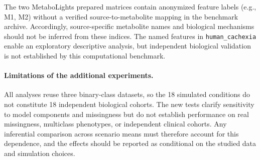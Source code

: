 The two MetaboLights prepared matrices contain anonymized feature labels (e.g., M1, M2) without a verified source-to-metabolite mapping in the benchmark archive. Accordingly, source-specific metabolite names and biological mechanisms should not be inferred from these indices. The named features in \texttt{human\_cachexia} enable an exploratory descriptive analysis, but independent biological validation is not established by this computational benchmark.

\paragraph{Limitations of the additional experiments.}
All analyses reuse three binary-class datasets, so the 18 simulated conditions do not constitute 18 independent biological cohorts. The new tests clarify sensitivity to model components and missingness but do not establish performance on real missingness, multiclass phenotypes, or independent clinical cohorts. Any inferential comparison across scenario means must therefore account for this dependence, and the effects should be reported as conditional on the studied data and simulation choices.

